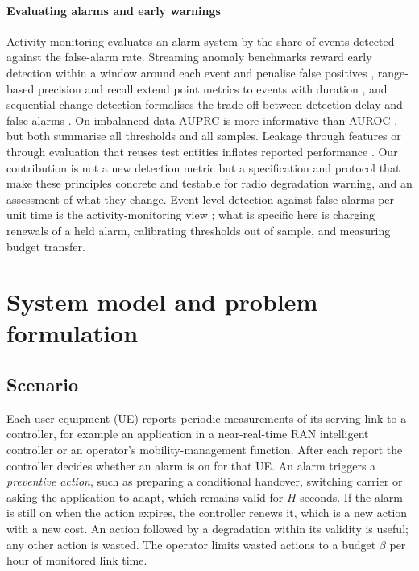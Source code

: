 \documentclass[preprint,review,12pt]{elsarticle}
\begin{document}
\paragraph{Evaluating alarms and early warnings}
Activity monitoring \cite{fawcett1999} evaluates an alarm system by the share of
events detected against the false-alarm rate. Streaming anomaly benchmarks reward
early detection within a window around each event and penalise false positives
\cite{lavin2015}, range-based precision and recall extend point metrics to events
with duration \cite{tatbul2018}, and sequential change detection formalises the
trade-off between detection delay and false alarms \cite{tartakovsky2014}. On
imbalanced data AUPRC is more informative than AUROC \cite{saito2015}, but both
summarise all thresholds and all samples. Leakage through features or through
evaluation that reuses test entities inflates reported performance
\cite{kaufman2012,kapoor2023}. Our contribution is not a new detection metric but
a specification and protocol that make these principles concrete and testable for
radio degradation warning, and an assessment of what they change. Event-level
detection against false alarms per unit time is the activity-monitoring view
\cite{fawcett1999}; what is specific here is charging renewals of a held alarm,
calibrating thresholds out of sample, and measuring budget transfer.

\section{System model and problem formulation}
\label{sec:model}

\subsection{Scenario}
Each user equipment (UE) reports periodic measurements of its serving link to a
controller, for example an application in a near-real-time RAN intelligent
controller \cite{polese2023} or an operator's mobility-management function. After
each report the controller decides whether an alarm is on for that UE. An alarm
triggers a \emph{preventive action}, such as preparing a conditional handover,
switching carrier or asking the application to adapt, which remains valid for $H$
seconds. If the alarm is still on when the action expires, the controller renews it,
which is a new action with a new cost. An action followed by a degradation within its
validity is useful; any other action is wasted. The operator limits wasted actions
to a budget $\beta$ per hour of monitored link time.
\end{document}
